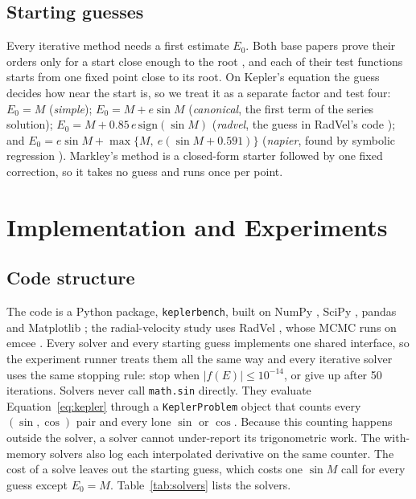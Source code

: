 \documentclass[sigconf,nonacm]{acmart}
\begin{document}
\subsection{Starting guesses}
\label{sec:guesses}

Every iterative method needs a first estimate $E_0$. Both base papers
prove their orders only for a start close enough to the root
\cite{nwm9,nwm11}, and each of their test functions starts from one fixed
point close to its root. On Kepler's equation the guess decides how near
the start is, so we treat it as a separate factor and test four:
$E_0 = M$ (\emph{simple});
$E_0 = M + e\sin M$ (\emph{canonical}, the first term of the series
solution);
$E_0 = M + 0.85\,e\,\mathrm{sign}(\sin M)$ (\emph{radvel}, the guess in
RadVel's code \cite{radvelsrc}); and
$E_0 = e\sin M + \max\{M,\ e(\sin M + 0.591)\}$ (\emph{napier}, found by
symbolic regression \cite{napier}).
Markley's method \cite{markley} is a closed-form starter followed by one
fixed correction, so it takes no guess and runs once per point.

\section{Implementation and Experiments}

\subsection{Code structure}
\label{sec:code}

The code is a Python package, \texttt{keplerbench}, built on NumPy
\cite{numpy}, SciPy \cite{scipy}, pandas \cite{pandas} and Matplotlib
\cite{matplotlib}; the radial-velocity study uses RadVel \cite{radvel},
whose MCMC runs on emcee \cite{emcee}. Every solver and every
starting guess implements one shared interface, so the experiment runner
treats them all the same way and every iterative solver uses the same
stopping rule: stop when $|f(E)| \le 10^{-14}$, or give up after 50
iterations. Solvers never call \texttt{math.sin} directly. They evaluate
Equation~\eqref{eq:kepler} through a \texttt{KeplerProblem} object that
counts every $(\sin,\cos)$ pair and every lone $\sin$ or $\cos$. Because
this counting happens outside the solver, a solver cannot under-report its
trigonometric work. The with-memory solvers also log each interpolated
derivative on the same counter. The cost of a solve leaves out the
starting guess, which costs one $\sin M$ call for every guess except
$E_0 = M$. Table~\ref{tab:solvers} lists the
solvers.
\end{document}
